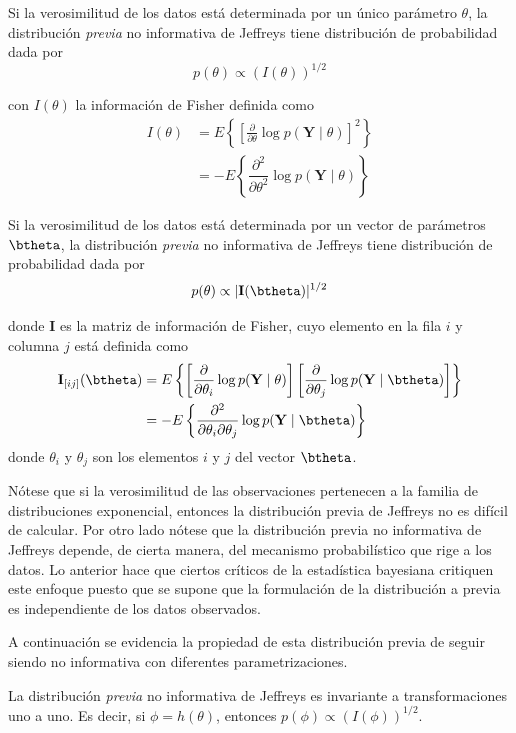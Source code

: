\documentclass[10pt,openright]{book}\usepackage[]{graphicx}\usepackage[]{color}
\begin{document}
\begin{Defi}
Si la verosimilitud de los datos está determinada por un único parámetro $\theta$, la distribución \emph{previa} no informativa de Jeffreys tiene distribución de probabilidad dada por
\begin{equation}
p(\theta)\propto (I(\theta))^{1/2}
\end{equation}

con $I(\theta)$ la información de Fisher definida como
\begin{align*}
I(\theta)&=E\left\{\left[\frac{\partial}{\partial\theta}\log{p(\mathbf{Y}\mid\theta)}\right]^2\right\}\\
&=-E\left\{\dfrac{\partial^2}{\partial\theta^2}\log{p(\mathbf{Y}\mid\theta)}\right\}
\end{align*}

Si la verosimilitud de los datos está determinada por un vector de parámetros $\btheta$, la distribución \emph{previa} no informativa de Jeffreys tiene distribución de probabilidad dada por
\begin{equation}
p(\theta)\propto |\mathbf{I}(\btheta)|^{1/2}
\end{equation}

donde $\mathbf{I}$ es la matriz de información de Fisher, cuyo elemento en la fila $i$ y columna $j$ está definida como
\begin{align*}
\mathbf{I}_{[ij]}(\btheta)&=E\left\{\left[\frac{\partial}{\partial\theta_i}\log{p(\mathbf{Y}\mid\theta)}\right]\left[\frac{\partial}{\partial\theta_j}\log{p(\mathbf{Y}\mid\btheta)}\right]\right\}\\
&=-E\left\{\dfrac{\partial^2}{\partial\theta_i\partial\theta_j}\log{p(\mathbf{Y}\mid\btheta)}\right\}
\end{align*}
donde $\theta_i$ y $\theta_j$ son los elementos $i$ y $j$ del vector $\btheta$.
\end{Defi}

Nótese que si la verosimilitud de las observaciones pertenecen a la familia de distribuciones exponencial, entonces la distribución previa de Jeffreys no es difícil de calcular. Por otro lado nótese que la distribución previa no informativa de Jeffreys depende, de cierta manera, del mecanismo probabilístico que rige a los datos. Lo anterior hace que ciertos críticos de la estadística bayesiana critiquen este enfoque puesto que se supone que la formulación de la distribución a previa es independiente de los datos observados.

A continuación se evidencia la propiedad de esta distribución previa de seguir siendo no informativa con diferentes parametrizaciones. 
\begin{Res}
La distribución \emph{previa} no informativa de Jeffreys es invariante a transformaciones uno a uno. Es decir, si $\phi=h(\theta)$, entonces $p(\phi)\propto(I(\phi))^{1/2}$.
\end{Res}
\end{document}

